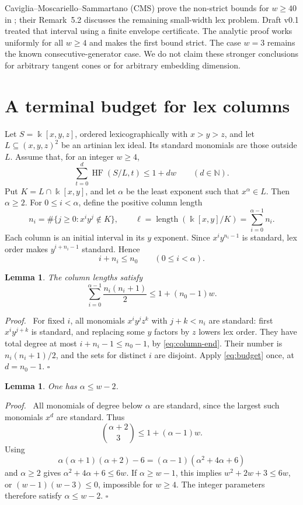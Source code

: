 \documentclass[11pt,a4paper]{article}
\newtheorem{lemma}[theorem]{Lemma}
\newenvironment{proof}[1][Proof]{\par\noindent\textit{#1.}\ \ignorespaces}{\unskip\nobreak\hfill\ensuremath{\square}\par}
\newcommand{\NN}{\mathbb N}
\newcommand{\kk}{\Bbbk}
\newcommand{\HF}{\operatorname{HF}}
\newcommand{\len}{\operatorname{length}}
\begin{document}
Caviglia--Moscariello--Sammartano (CMS) prove the non-strict bounds for $w\ge40$ in \cite[Theorem~1.5]{CMS}; their Remark~5.2 discusses the remaining small-width lex problem. Draft v0.1 treated that interval using a finite envelope certificate. The analytic proof works uniformly for all $w\ge4$ and makes the first bound strict. The case $w=3$ remains the known consecutive-generator case. We do not claim these stronger conclusions for arbitrary tangent cones or for arbitrary embedding dimension.

\section{A terminal budget for lex columns}
Let $S=\kk[x,y,z]$, ordered lexicographically with $x>y>z$, and let $L\subseteq(x,y,z)^2$ be an artinian lex ideal. Its standard monomials are those outside $L$. Assume that, for an integer $w\ge4$,
\begin{equation}\label{eq:budget}
 \sum_{t=0}^{d}\HF(S/L,t)\le1+dw\qquad(d\in\NN).
\end{equation}
Put $K=L\cap\kk[x,y]$, and let $\alpha$ be the least exponent such that $x^\alpha\in L$. Then $\alpha\ge2$. For $0\le i<\alpha$, define the positive column length
\[
 n_i=\#\{j\ge0:x^iy^j\notin K\},\qquad
 \ell=\len(\kk[x,y]/K)=\sum_{i=0}^{\alpha-1}n_i.
\]
Each column is an initial interval in its $y$ exponent. Since $x^iy^{n_i-1}$ is standard, lex order makes $y^{i+n_i-1}$ standard. Hence
\begin{equation}\label{eq:column-end}
 i+n_i\le n_0\qquad(0\le i<\alpha).
\end{equation}

\begin{lemma}\label{lem:terminal}
The column lengths satisfy
\begin{equation}\label{eq:terminal}
 \sum_{i=0}^{\alpha-1}\frac{n_i(n_i+1)}2\le1+(n_0-1)w.
\end{equation}
\end{lemma}
\begin{proof}
For fixed $i$, all monomials $x^iy^jz^k$ with $j+k<n_i$ are standard: first $x^iy^{j+k}$ is standard, and replacing some $y$ factors by $z$ lowers lex order. They have total degree at most $i+n_i-1\le n_0-1$, by \eqref{eq:column-end}. Their number is $n_i(n_i+1)/2$, and the sets for distinct $i$ are disjoint. Apply \eqref{eq:budget} once, at $d=n_0-1$.
\end{proof}

\begin{lemma}\label{lem:alpha}
One has $\alpha\le w-2$.
\end{lemma}
\begin{proof}
All monomials of degree below $\alpha$ are standard, since the largest such monomials $x^d$ are standard. Thus
\[
 \binom{\alpha+2}{3}\le1+(\alpha-1)w.
\]
Using
\[
 \alpha(\alpha+1)(\alpha+2)-6
   =(\alpha-1)(\alpha^2+4\alpha+6)
\]
and $\alpha\ge2$ gives $\alpha^2+4\alpha+6\le6w$. If $\alpha\ge w-1$, this implies $w^2+2w+3\le6w$, or $(w-1)(w-3)\le0$, impossible for $w\ge4$. The integer parameters therefore satisfy $\alpha\le w-2$.
\end{proof}
\end{document}
